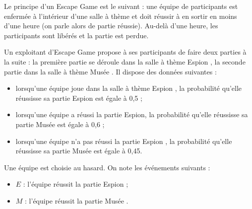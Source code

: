 \medskip

Le principe d'un Escape Game est le suivant : une équipe de participants est enfermée à l'intérieur d'une salle à thème et doit réussir à en sortir en moins d'une heure (on parle alors de partie réussie). Au-delà d'une heure, les participants sont libérés et la partie est perdue.

Un exploitant d'Escape Game propose à ses participants de faire deux parties à la suite : la première partie se déroule dans la salle à thème \og Espion \fg, la seconde partie dans la salle à thème \og Musée \fg{}. Il dispose des données suivantes :
\begin{itemize}
\item lorsqu'une équipe joue dans la salle à thème \og Espion \fg{}, la probabilité qu'elle réussisse sa partie \og Espion \fg{} est égale à 0,5 ;
\item lorsqu'une équipe a réussi la partie \og Espion\fg, la probabilité qu'elle réussisse sa partie \og Musée \fg{} est égale à 0,6 ;
\item lorsqu'une équipe n'a pas réussi la partie \og Espion \fg, la probabilité qu'elle réussisse sa partie \og Musée \fg{} est égale à 0,45.
\end{itemize}
 
Une équipe est choisie au hasard. On note les événements suivants :
\begin{itemize}
\item $E$ : \og l'équipe réussit la partie \og Espion \fg{} ;
\item $M$ : \og l'équipe réussit la partie \og Musée \fg.
\end{itemize} 

\medskip

